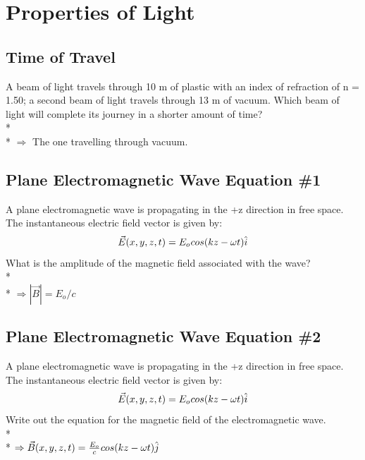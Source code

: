 \documentclass[11pt]{article}
\begin{document}

\pagebreak
\section{Properties of Light}
\vspace{10pt}

\subsection{Time of Travel}
A beam of light travels through 10 m of plastic with an index of refraction of n = 1.50; a second beam of light travels through 13 m of vacuum.  Which beam of light will complete its journey in a shorter amount of time? \\* \\*
$\Rightarrow$ The one travelling through vacuum.

\subsection{Plane Electromagnetic Wave Equation \#1}
A plane electromagnetic wave is propagating in the +z direction in free space.  The instantaneous electric field vector is given by:
\begin{equation}
\vec{E}(x,y,z,t) = E_o \hspace{0.01cm}cos(kz - \omega t) \hat{i}
\end{equation}
What is the amplitude of the magnetic field associated with the wave?\\* \\*
$\Rightarrow |\vec{B}| = E_o / c$

\subsection{Plane Electromagnetic Wave Equation \#2}
A plane electromagnetic wave is propagating in the +z direction in free space.  The instantaneous electric field vector is given by:
\begin{equation}
\vec{E}(x,y,z,t) = E_o \hspace{0.01cm}cos(kz - \omega t) \hat{i}
\end{equation} 
Write out the equation for the magnetic field of the electromagnetic wave.\\* \\*
$\Rightarrow \vec{B}(x,y,z,t) = \frac{E_o}{c} \hspace{0.01cm}cos(kz - \omega t) \hat{j}$
\end{document}
